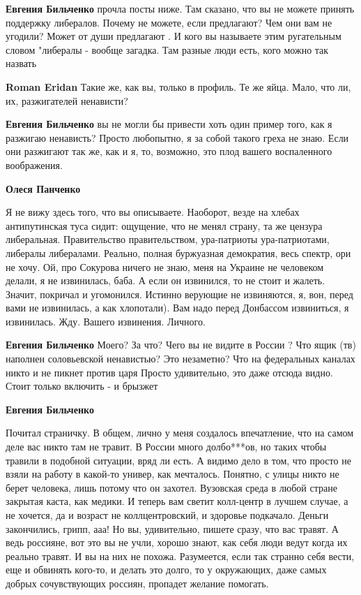\begin{itemize}
\begin{itemize}
\textbf{Евгения Бильченко} прочла посты ниже. Там сказано, что вы не можете принять поддержку либералов.
Почему не можете, если предлагают? Чем они вам не угодили?
Может от души предлагают .
И кого вы называете этим ругательным словом "либералы - вообще загадка.
Там разные люди есть, кого можно так назвать


\textbf{Roman Eridan} Такие же, как вы, только в профиль. Те же яйца. Мало, что ли, их, разжигателей ненависти?

\textbf{Евгения Бильченко} вы не могли бы привести хоть один пример того, как я разжигаю ненависть?
Просто любопытно, я за собой такого греха не знаю.
Если они разжигают так же, как и я, то, возможно, это плод вашего воспаленного воображения.

\textbf{Олеся Панченко} 

Я не вижу здесь того, что вы описываете. Наоборот, везде на хлебах
антипутинская туса сидит: ощущение, что не менял страну, та же цензура
либеральная. Правительство правительством, ура-патриоты ура-патриотами,
либералы либералами. Реально, полная буржуазная демократия, весь спектр, ори не
хочу. Ой, про Сокурова ничего не знаю, меня на Украине не человеком делали, я
не извинилась, баба. А если он извинился, то не стоит и жалеть. Значит,
покричал и угомонился. Истинно верующие не извиняются, я, вон, перед вами не
извинилась, а как хлопотали). Вам надо перед Донбассом извиниться, я
извинилась. Жду. Вашего извинения. Личного.

\textbf{Евгения Бильченко} Моего? За что?
Чего вы не видите в России ? Что ящик (тв) наполнен соловьевской ненавистью? Это незаметно?
Что на федеральных каналах никто и не пикнет против царя
Просто удивительно, это даже отсюда видно.
Стоит только включить - и брызжет

\textbf{Евгения Бильченко} 

Почитал страничку. В общем, лично у меня создалось впечатление, что на самом
деле вас никто там не травит. В России много долбо***ов, но таких чтобы травили
в подобной ситуации, вряд ли есть. А видимо дело в том, что просто не взяли на
работу в какой-то универ, как мечталось. Понятно, с улицы никто не берет
человека, лишь потому что он захотел. Вузовская среда в любой стране закрытая
каста, как медики. И теперь вам светит колл-центр в лучшем случае, а не
хочется, да и возраст не коллцентровский, и здоровье подкачало. Деньги
закончились, грипп, ааа! Но вы, удивительно, пишете сразу, что вас травят. А
ведь россияне, вот это вы не учли, хорошо знают, как себя люди ведут когда их
реально травят. И вы на них не похожа. Разумеется, если так странно себя вести,
еще и обвинять кого-то, и делать это долго, то у окружающих, даже самых добрых
сочувствующих россиян, пропадет желание помогать.


\end{itemize}
\end{itemize}
